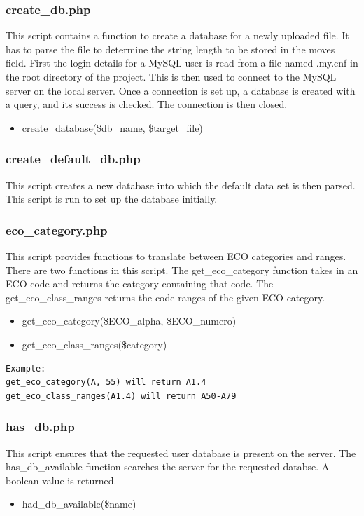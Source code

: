 \documentclass{article}
\begin{document}
\subsubsection{create\_db.php}
This script contains a function to create a database for a newly uploaded
file. It has to parse the file to determine the string length to be stored
in the moves field. First the login details for a MySQL user is read from
a file named .my.cnf in the root directory of the project.  This is then
used to connect to the MySQL server on the local server.  Once a connection
is set up, a database is created with a query, and its success is checked.
The connection is then closed.
\begin{itemize}
	\item create\_database(\$db\_name, \$target\_file)
\end{itemize}

\subsubsection{create\_default\_db.php}
This script creates a new database into which the default data set is then
parsed. This script is run to set up the database initially.

\subsubsection{eco\_category.php}
This script provides functions to translate between ECO categories and ranges.
There are two functions in this script. The get\_eco\_category function takes
in an ECO code and returns the category containing that code. The
get\_eco\_class\_ranges returns the code ranges of the given ECO category.
\begin{itemize}
	\item get\_eco\_category(\$ECO\_alpha, \$ECO\_numero)
	\item get\_eco\_class\_ranges(\$category)
\end{itemize}
\begin{lstlisting}
Example:
get_eco_category(A, 55) will return A1.4
get_eco_class_ranges(A1.4) will return A50-A79
\end{lstlisting}

\subsubsection{has\_db.php}
This script ensures that the requested user database is present on the server.
The has\_db\_available function searches the server for the requested databse.
A boolean value is returned.
\begin{itemize}
	\item had\_db\_available(\$name)
\end{itemize}
\end{document}

